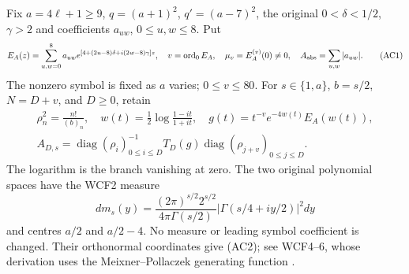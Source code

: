 \documentclass[11pt]{article}
\theoremstyle{remark}\newtheorem{remark}[theorem]{Remark}
\begin{document}
Fix $a=4\ell+1\ge9$, $q=(a+1)^2$, $q'=(a-7)^2$, the original
$0<\delta<1/2$, $\gamma>2$ and coefficients $a_{uw}$, $0\le u,w\le8$.
Put
\[
 E_A(z)=\sum_{u,w=0}^8 a_{uw}e^{[4+(2u-8)\delta+i(2w-8)\gamma]z},
 \quad v=\operatorname{ord}_0E_A,\quad \mu_v=E_A^{(v)}(0)\ne0,
 \quad A_{\rm abs}=\sum_{u,w}|a_{uw}|. \tag{AC1}
\]
The nonzero symbol is fixed as $a$ varies; $0\le v\le80$.
For $s\in\{1,a\}$, $b=s/2$, $N=D+v$, and $D\ge0$, retain
\[
 \begin{gathered}
 \rho_n^2=\frac{n!}{(b)_n},\quad
 w(t)=\tfrac12\log\frac{1-it}{1+it},\quad
 g(t)=t^{-v}e^{-4w(t)}E_A(w(t)),\\
 A_{D,s}=\operatorname{diag}(\rho_i)_{0\le i\le D}^{-1}
 T_D(g)\operatorname{diag}(\rho_{j+v})_{0\le j\le D}.
 \end{gathered}\tag{AC2}
\]
The logarithm is the branch vanishing at zero. The two original
polynomial spaces have the WCF2 measure
\[
 dm_s(y)=\frac{(2\pi)^{s/2}2^{s/2}}{4\pi\Gamma(s/2)}
 |\Gamma(s/4+iy/2)|^2dy
\]
and centres $a/2$ and $a/2-4$. No measure or leading symbol coefficient
is changed. Their orthonormal coordinates give (AC2); see WCF4--6,
whose derivation uses the Meixner--Pollaczek generating function
\cite[18.23.7]{DLMF18}.
\end{document}
